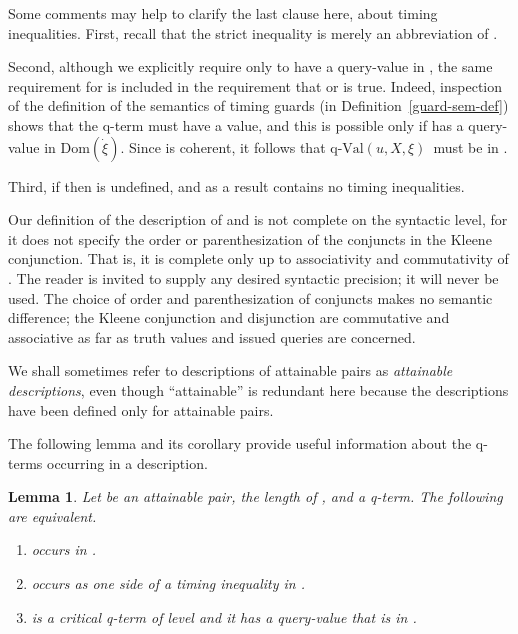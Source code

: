 \documentclass{LMCS}
\newtheorem{la}[thm]{Lemma}
\theoremstyle{definition}
\newenvironment{lsnum}{\begin{enumerate}}{\end{enumerate}}
\newcommand{\ans}{\dot}
\newcommand{\dom}[1]{\ensuremath{{\text{Dom}}(#1)}}
\newcommand{\qval}[3]{\ensuremath{\text{q-Val}(#1,#2,#3)}}
\begin{document}
Some comments may help to clarify the last clause here, about
timing inequalities.  First, recall that the strict inequality
 is merely an abbreviation of .

Second, although we explicitly require only  to have a query-value
in ,
the same requirement for  is included in the
requirement that  or  is true.  Indeed,
inspection of the definition of the semantics of timing guards (in
Definition~\ref{guard-sem-def}) shows that the q-term  must have a
value, and this is possible only if  has a query-value in
\dom{\ans\xi}.  Since  is coherent, it follows that \qval uX\xi\
must be in .

Third, if  then  is undefined, and as a result
 contains no timing inequalities.

Our definition of the description of  and  is not complete on
the syntactic level, for it does not specify the order or
parenthesization of the conjuncts in the Kleene conjunction.  That is,
it is complete only up to associativity and commutativity of .
The reader is invited to supply any desired syntactic precision; it
will never be used. The choice of order and parenthesization of
conjuncts makes no semantic difference; the Kleene conjunction and
disjunction are commutative and associative as far as truth values and
issued queries are concerned.

We shall sometimes refer to descriptions of attainable pairs as
\emph{attainable descriptions}, even though ``attainable'' is
redundant here because the descriptions have been defined only for
attainable pairs.

The following lemma and its corollary provide useful information about
the q-terms occurring in a description.

\begin{la}
Let  be an attainable pair,  the length of , and
 a q-term.  The following are equivalent.
\begin{lsnum}
\item  occurs in .
\item  occurs as one side of a timing inequality in
  .
\item  is a critical q-term of level  and it has a
  query-value  that is in .
\end{lsnum}
\end{la}
\end{document}

